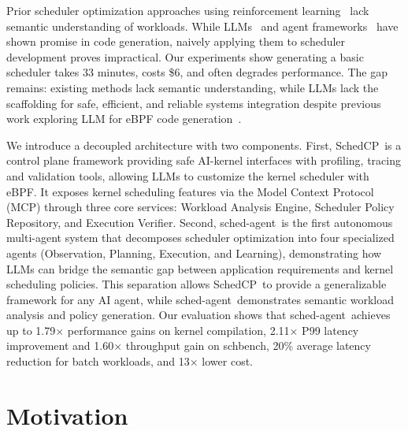 \documentclass[preprint]{article}
\newcommand{\sys}{SchedCP\xspace}
\newcommand{\agent}{sched-agent\xspace}
\begin{document}
Prior scheduler optimization approaches using reinforcement learning~\cite{mao2019decima,qiu2020firm} lack semantic understanding of workloads. While LLMs~\cite{openai2023gpt4,anthropic2024claude} and agent frameworks~\cite{autogen,geminicli,claudecode,qian2024chatdev,hong2023metagpt} have shown promise in code generation, naively applying them to scheduler development proves impractical. Our experiments show generating a basic scheduler takes 33 minutes, costs \$6, and often degrades performance. The gap remains: existing methods lack semantic understanding, while LLMs lack the scaffolding for safe, efficient, and reliable systems integration despite previous work exploring LLM for eBPF code generation~\cite{kgent}.

We introduce a decoupled architecture with two components. First, \sys\ is a control plane framework providing safe AI-kernel interfaces with profiling, tracing and validation tools, allowing LLMs to customize the kernel scheduler with eBPF. It exposes kernel scheduling features via the Model Context Protocol (MCP) through three core services: Workload Analysis Engine, Scheduler Policy Repository, and Execution Verifier. Second, \agent\ is the first autonomous multi-agent system that decomposes scheduler optimization into four specialized agents (Observation, Planning, Execution, and Learning), demonstrating how LLMs can bridge the semantic gap between application requirements and kernel scheduling policies. This separation allows \sys\ to provide a generalizable framework for any AI agent, while \agent\ demonstrates semantic workload analysis and policy generation. Our evaluation shows that \agent\ achieves up to 1.79× performance gains on kernel compilation, 2.11× P99 latency improvement and 1.60× throughput gain on schbench, 20\% average latency reduction for batch workloads, and 13× lower cost.

\section{Motivation}
\label{sec:motivation}
\end{document}
